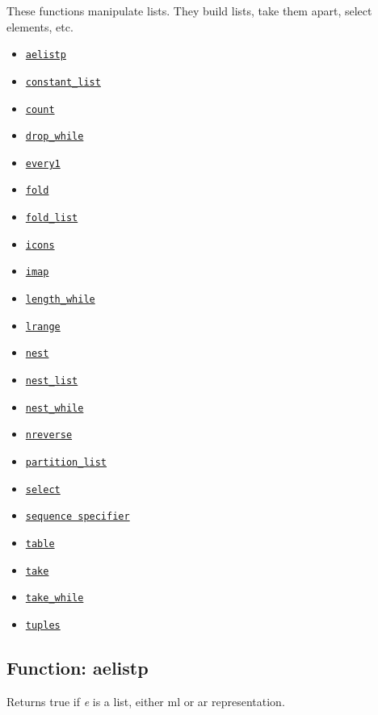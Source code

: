 \documentclass[]{article}
\begin{document}
 These functions manipulate lists. They build lists, take them apart, select elements, etc.
\begin{itemize}
\item \hyperlink{aelistp}{{\tt aelistp}}
\item \hyperlink{constant_list}{{\tt constant\_list}}
\item \hyperlink{count}{{\tt count}}
\item \hyperlink{drop_while}{{\tt drop\_while}}
\item \hyperlink{every1}{{\tt every1}}
\item \hyperlink{fold}{{\tt fold}}
\item \hyperlink{fold_list}{{\tt fold\_list}}
\item \hyperlink{icons}{{\tt icons}}
\item \hyperlink{imap}{{\tt imap}}
\item \hyperlink{length_while}{{\tt length\_while}}
\item \hyperlink{lrange}{{\tt lrange}}
\item \hyperlink{nest}{{\tt nest}}
\item \hyperlink{nest_list}{{\tt nest\_list}}
\item \hyperlink{nest_while}{{\tt nest\_while}}
\item \hyperlink{nreverse}{{\tt nreverse}}
\item \hyperlink{partition_list}{{\tt partition\_list}}
\item \hyperlink{select}{{\tt select}}
\item \hyperlink{sequence specifier}{{\tt sequence specifier}}
\item \hyperlink{table}{{\tt table}}
\item \hyperlink{take}{{\tt take}}
\item \hyperlink{take_while}{{\tt take\_while}}
\item \hyperlink{tuples}{{\tt tuples}}
\end{itemize}
\subsection{Function: aelistp\label{sec:aelistp}}
\hypertarget{aelistp}{}



\vspace{5 pt}
Returns true if {\it e} is a list, either ml or ar representation. 

\vspace{5 pt}
\end{document}
